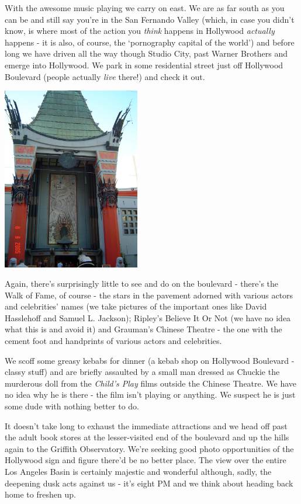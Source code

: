 \documentclass[a5paper,titlepage,11pt]{book}
\begin{document}
With the awesome music playing we carry on east. We are as far south as you can be and still say you're in the San Fernando Valley (which, in case you didn't know, is where most of the action you \emph{think} happens in Hollywood \emph{actually} happens - it is also, of course, the `pornography capital of the world') and before long we have driven all the way though Studio City, past Warner Brothers and emerge into Hollywood. We park in some residential street just off Hollywood Boulevard (people actually \emph{live} there!) and check it out.

\begin{center}\includegraphics[height=80mm]{gfx/DSC00806}\end{center}

Again, there's surprisingly little to see and do on the boulevard - there's the Walk of Fame, of course - the stars in the pavement adorned with various actors and celebrities' names (we take pictures of the important ones like David Hasslehoff and Samuel L. Jackson); Ripley's Believe It Or Not (we have no idea what this is and avoid it) and Grauman's Chinese Theatre - the one with the cement foot and handprints of various actors and celebrities.

We scoff some greasy kebabs for dinner (a kebab shop on Hollywood Boulevard - classy stuff) and are briefly assaulted by a small man dressed as Chuckie the murderous doll from the \emph{Child's Play} films outside the Chinese Theatre. We have no idea why he is there - the film isn't playing or anything. We suspect he is just some dude with nothing better to do.

It doesn't take long to exhaust the immediate attractions and we head off past the adult book stores at the lesser-visited end of the boulevard and up the hills again to the Griffith Observatory. We're seeking good photo opportunities of the Hollywood sign and figure there'd be no better place. The view over the entire Los Angeles Basin is certainly majestic and wonderful although, sadly, the deepening dusk acts against us - it's eight PM and we think about heading back home to freshen up.
\end{document}
